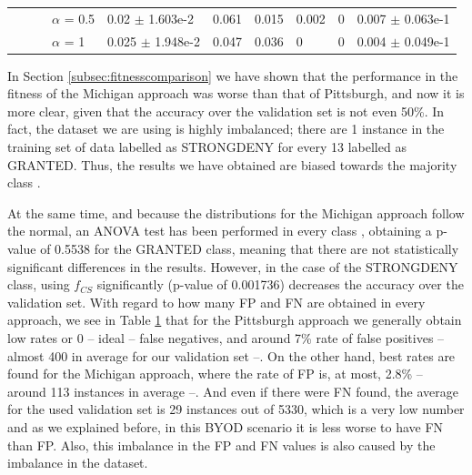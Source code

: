 \documentclass[runningheads]{llncs}
\begin{document}
\begin{table}
{\begin{tabular}{llll|l|l|l|l|l|l|}
			\multicolumn{1}{|l|}{}                                                                                             & \multicolumn{1}{l|}{}                                                                             & \multicolumn{1}{l|}{}                          & $\alpha$ = 0.5 & 0.02 $\pm$ 1.603e-2  & 0.061 & 0.015  & 0.002 & 0 & 0.007 $\pm$ 0.063e-1 \\ \cline{4-10} 
			\multicolumn{1}{|l|}{}                                                                                             & \multicolumn{1}{l|}{}                                                                             & \multicolumn{1}{l|}{}                          & $\alpha$ = 1   & 0.025 $\pm$ 1.948e-2 & 0.047 & 0.036  & 0     & 0 & 0.004 $\pm$ 0.049e-1 \\ \hline
		\end{tabular}
	}
	\label{tab:PvsMvalidation}
\end{table}

In Section \ref{subsec:fitnesscomparison} we have shown that the performance in the
fitness of the Michigan approach was worse than that of Pittsburgh,
and now it is more clear, given that the accuracy over the validation set is
not even 50\%. In fact, the dataset we are using is highly imbalanced; there are 1 instance
in the training set of data labelled as STRONGDENY for every 13
labelled as GRANTED. Thus, the results we have obtained are biased towards the majority
class \cite{japkowicz2002class}. 

At the same time, and because the distributions for the Michigan approach follow the normal, an ANOVA test has been performed in every class \cite{DerracTests11}, obtaining a p-value of 0.5538 for the GRANTED class, meaning that there are not statistically significant differences in the results. However, in the case of the STRONGDENY class, using $f_{CS}$ significantly (p-value of 0.001736) decreases the accuracy over the validation set. With regard to how many FP and FN are obtained in every approach, we see in Table \ref{tab:PvsMvalidation} that for the Pittsburgh approach we generally obtain low rates or 0 -- ideal -- false negatives, and around 7\% rate of false positives -- almost 400 in average for our validation set --. On the other hand, best rates are found for the Michigan approach, where the rate of FP is, at most, 2.8\% -- around 113 instances in average --. And even if there were FN found, the average for the used validation set is 29 instances out of 5330, which is a very low number and as we explained before, in this BYOD scenario it is less worse to have FN than FP. Also, this imbalance in the FP and FN values is also caused by the imbalance in the dataset.
\end{document}
